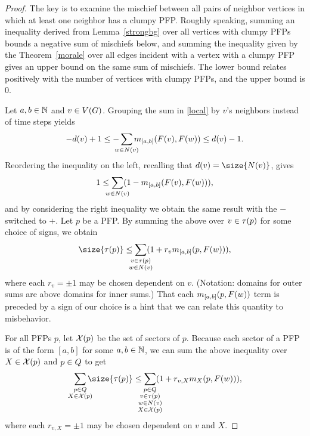 \begin{proof}
The key is to examine the mischief between all pairs of neighbor vertices in
which at least one neighbor has a clumpy PFP. Roughly speaking, summing an
inequality derived from Lemma~\ref{strongbg} over all vertices with clumpy PFPs
bounds a negative sum of mischiefs below, and summing the inequality given by
the Theorem~\ref{morale} over all edges incident with a vertex with a clumpy
PFP gives an upper bound on the same sum of mischiefs. The lower bound relates
positively with the number of vertices with clumpy PFPs, and the upper bound is
0.

Let $a,b \in \mathbb{N}$ and $v \in V(G)$. Grouping the sum in \eqref{local} by $v$'s
neighbors instead of time steps yields
\[
  -\deg{v} + 1 \leq -\smashoperator{\sum_{w \in
      \N{v}}}\misb{[a,b]}{\pfp{v}}{\pfp{w}} \leq \deg{v} - 1.
\]
Reordering the inequality on the left, recalling that $\deg{v} = \size{\N{v}}$,
gives
\[
  1 \leq \smashoperator{\sum_{w \in \N{v}}}(1 - \misb{[a,b]}{\pfp{v}}{\pfp{w}}),
\]
and by considering the right inequality we obtain the same result with the $-$
switched to $+$. Let $p$ be a PFP. By summing the above over $v \in
\pfpverts{p}$ for some choice of signs, we obtain
\[
  \size{\pfpverts{p}} \leq \smashoperator{\sum_{\substack{v \in \pfpverts{p}
        \\ w \in \N{v}}}}(1 + r_v\misb{[a,b]}{p}{\pfp{w}}),
\]
where each $r_v = \pm1$ may be chosen dependent on $v$. (Notation: domains for
outer sums are above domains for inner sums.) That each
$\misb{[a,b]}{p}{\pfp{w}}$ term is preceded by a sign of our choice is a hint
that we can relate this quantity to misbehavior.

For all PFPs $p$, let $\mathcal{X}(p)$ be the set of sectors of $p$. Because each
sector of a PFP is of the form $[a,b]$ for some $a,b \in \mathbb{N}$, we can sum the
above inequality over $X \in \mathcal{X}(p)$ and $p \in \cpfps$ to get
\begin{equation}\label{almost}
  \smashoperator[r]{\sum_{\substack{
        p \in \cpfps \\
        X \in \sctr{p}
  }}}\size{\pfpverts{p}} \leq
  \smashoperator{\sum_{\substack{
        p \in \cpfps \\ v \in \pfpverts{p} \\
        w \in \N{v} \\ X \in \sctr{p}
  }}}(1 + r_{v,X}\misb{X}{p}{\pfp{w}}),
\end{equation}
where each $r_{v,X} = \pm1$ may be chosen dependent on $v$ and $X$.


\end{proof}
